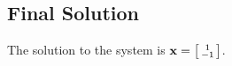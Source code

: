\documentclass{article}
\begin{document}
\subsection{Final Solution}
The solution to the system is $\mathbf{x} = \begin{bsmallmatrix} 1 \\ -1 \end{bsmallmatrix}$.

\end{document}
